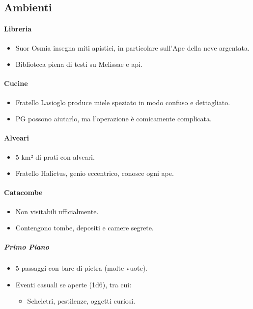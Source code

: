 \documentclass{article}
\begin{document}
\subsection{Ambienti}

\paragraph{Libreria}
\begin{itemize}
    \item Suor Osmia insegna miti apistici, in particolare sull’Ape della neve argentata.
    \item Biblioteca piena di testi su Melissae e api.
\end{itemize}

\paragraph{Cucine}
\begin{itemize}
    \item Fratello Lasioglo produce miele speziato in modo confuso e dettagliato.
    \item PG possono aiutarlo, ma l’operazione è comicamente complicata.
\end{itemize}

\paragraph{Alveari}
\begin{itemize}
    \item 5 km² di prati con alveari.
    \item Fratello Halictus, genio eccentrico, conosce ogni ape.
\end{itemize}

\paragraph{Catacombe}
\begin{itemize}
    \item Non visitabili ufficialmente.
    \item Contengono tombe, depositi e camere segrete.
\end{itemize}

\subparagraph{Primo Piano}
\begin{itemize}
    \item 5 passaggi con bare di pietra (molte vuote).
    \item Eventi casuali se aperte (1d6), tra cui:
    \begin{itemize}
        \item Scheletri, pestilenze, oggetti curiosi.
    \end{itemize}
\end{itemize}
\end{document}
